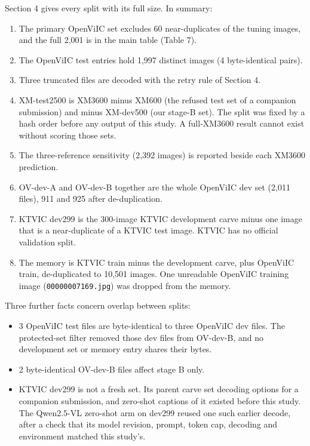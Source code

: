 Section 4 gives every split with its full size. In summary:

\begin{enumerate}
\def\labelenumi{\arabic{enumi}.}
\tightlist
\item
  The primary OpenViIC set excludes 60 near-duplicates of the tuning images, and the full 2,001 is
  in the main table (Table 7).
\item
  The OpenViIC test entries hold 1,997 distinct images (4 byte-identical pairs).
\item
  Three truncated files are decoded with the retry rule of Section 4.
\item
  XM-test2500 is XM3600 minus XM600 (the refused test set of a companion submission) and minus
  XM-dev500 (our stage-B set). The split was fixed by a hash order before any output of this study.
  A full-XM3600 result cannot exist without scoring those sets.
\item
  The three-reference sensitivity (2,392 images) is reported beside each XM3600 prediction.
\item
  OV-dev-A and OV-dev-B together are the whole OpenViIC dev set (2,011 files), 911 and 925 after
  de-duplication.
\item
  KTVIC dev299 is the 300-image KTVIC development carve minus one image that is a near-duplicate of
  a KTVIC test image. KTVIC has no official validation split.
\item
  The memory is KTVIC train minus the development carve, plus OpenViIC train, de-duplicated to
  10,501 images. One unreadable OpenViIC training image (\texttt{00000007169.jpg}) was dropped from
  the memory.
\end{enumerate}

Three further facts concern overlap between splits:

\begin{itemize}
\tightlist
\item
  3 OpenViIC test files are byte-identical to three OpenViIC dev files. The protected-set filter
  removed those dev files from OV-dev-B, and no development set or memory entry shares their bytes.
\item
  2 byte-identical OV-dev-B files affect stage B only.
\item
  KTVIC dev299 is not a fresh set. Its parent carve set decoding options for a companion submission,
  and zero-shot captions of it existed before this study. The Qwen2.5-VL zero-shot arm on dev299
  reused one such earlier decode, after a check that its model revision, prompt, token cap, decoding
  and environment matched this study's.
\end{itemize}

